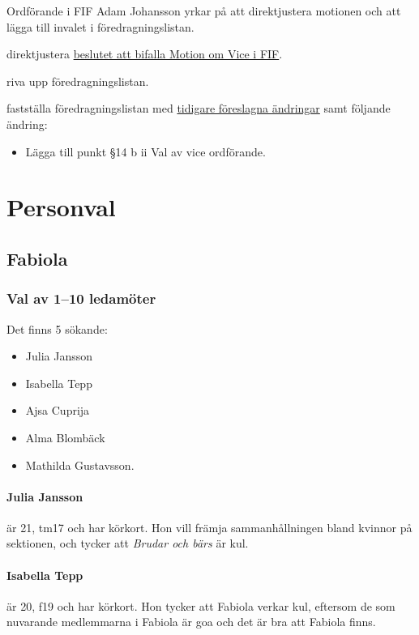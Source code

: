 \documentclass[hidelinks]{sektionsmote}
\begin{document}
\begin{ofraga}
  Ordförande i FIF Adam Johansson yrkar på att direktjustera motionen och att lägga till invalet i föredragningslistan.
  \begin{beslut}\label{beslut:foredragningslista-2}
    \item direktjustera \hyperref[beslut:vice-fif-bifall]{beslutet att bifalla  Motion om Vice i FIF}.
    \item riva upp föredragningslistan.
    \item fastställa föredragningslistan med \hyperref[beslut:foredragningslista-1]{tidigare föreslagna ändringar} samt följande ändring:
    \begin{itemize}
      \item Lägga till punkt §14 b ii Val av vice ordförande.
    \end{itemize}
  \end{beslut}
\end{ofraga}


\section{Personval}
\subsection{Fabiola}
\subsubsection{Val av 1--10 ledamöter}
Det finns 5 sökande:
\begin{itemize}
    \item Julia Jansson
    \item Isabella Tepp
    \item Ajsa Cuprija
    \item Alma Blombäck
    \item Mathilda Gustavsson.
\end{itemize}

\paragraph{Julia Jansson} är 21, tm17 och har körkort.
Hon vill främja sammanhållningen bland kvinnor på sektionen, och tycker att \textit{Brudar och bärs} är kul.

\paragraph{Isabella Tepp} är 20, f19 och har körkort.
Hon tycker att Fabiola verkar kul, eftersom de som nuvarande medlemmarna i Fabiola är goa och det är bra att Fabiola finns.
\end{document}
